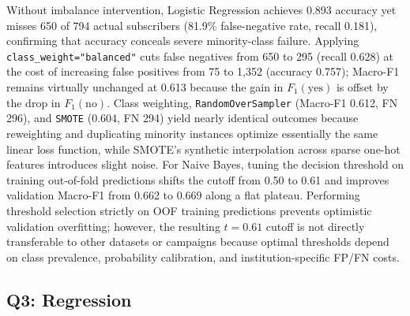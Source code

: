 Without imbalance intervention, Logistic Regression achieves 0.893 accuracy yet misses 650 of 794 actual subscribers (81.9\% false-negative rate, recall 0.181), confirming that accuracy conceals severe minority-class failure. Applying \texttt{class\_weight="balanced"} cuts false negatives from 650 to 295 (recall 0.628) at the cost of increasing false positives from 75 to 1,352 (accuracy 0.757); Macro-F1 remains virtually unchanged at 0.613 because the gain in $F_1(\text{yes})$ is offset by the drop in $F_1(\text{no})$. Class weighting, \texttt{RandomOverSampler} (Macro-F1 0.612, FN 296), and \texttt{SMOTE} (0.604, FN 294) yield nearly identical outcomes because reweighting and duplicating minority instances optimize essentially the same linear loss function, while SMOTE's synthetic interpolation across sparse one-hot features introduces slight noise. For Naive Bayes, tuning the decision threshold on training out-of-fold predictions shifts the cutoff from 0.50 to 0.61 and improves validation Macro-F1 from 0.662 to 0.669 along a flat plateau. Performing threshold selection strictly on OOF training predictions prevents optimistic validation overfitting; however, the resulting $t = 0.61$ cutoff is not directly transferable to other datasets or campaigns because optimal thresholds depend on class prevalence, probability calibration, and institution-specific FP/FN costs.

\subsection{Q3: Regression}

